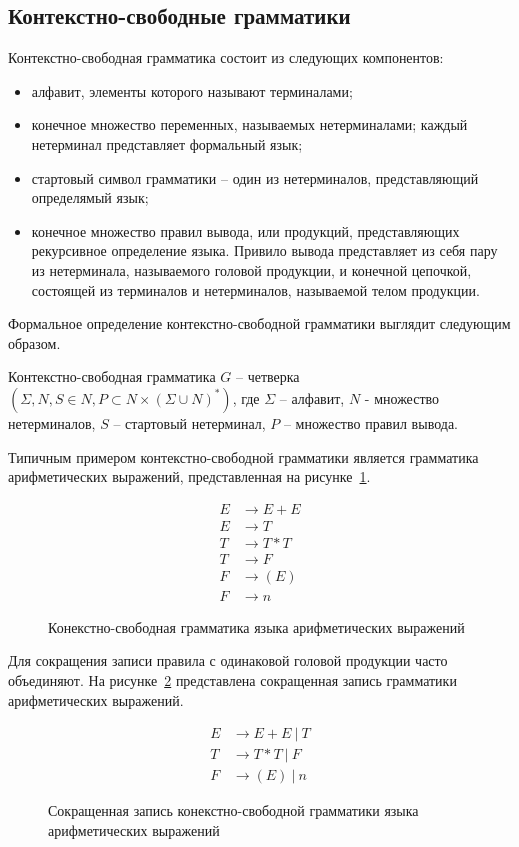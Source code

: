 \subsection{Контекстно-свободные грамматики}
Контекстно-свободная грамматика состоит из следующих компонентов:
\begin{itemize}
    \item алфавит, элементы которого называют терминалами;
    \item конечное множество переменных, называемых нетерминалами; каждый нетерминал представляет формальный язык;
    \item стартовый символ грамматики -- один из нетерминалов, представляющий определямый язык;
    \item конечное множество правил вывода, или продукций, представляющих рекурсивное определение языка.
    Привило вывода представляет из себя пару из нетерминала, называемого головой продукции, и конечной цепочкой,
    состоящей из терминалов и нетерминалов, называемой телом продукции.
\end{itemize}
Формальное определение контекстно-свободной грамматики выглядит следующим образом.
\begin{definition}
Контекстно-свободная грамматика $G$ -- четверка $(\Sigma, N, S \in N, P \subset N \times (\Sigma \cup N)^*)$,
где $\Sigma$ -- алфавит, $N$ - множество нетерминалов, $S$ -- стартовый нетерминал, $P$ -- множество правил вывода.
\end{definition}
Типичным примером контекстно-свободной грамматики является грамматика арифметических выражений, представленная на рисунке~\ref{cf-expr}.
\begin{figure}[htb]
    \begin{align*}
        E &\rightarrow E + E\\
        E &\rightarrow T\\
        T &\rightarrow T * T\\
        T &\rightarrow F\\
        F &\rightarrow (E)\\
        F &\rightarrow n
    \end{align*}
    \caption{Конекстно-свободная грамматика языка арифметических выражений}
    \label{cf-expr}
\end{figure}
Для сокращения записи правила с одинаковой головой продукции часто объединяют. На рисунке~\ref{cf-expr-small} представлена сокращенная запись грамматики арифметических выражений.
\begin{figure}[htb]
    \begin{align*}
        E &\rightarrow E + E\ |\ T\\
        T &\rightarrow T * T\ |\ F\\
        F &\rightarrow (E)\ |\ n
    \end{align*}
    \caption{Сокращенная запись конекстно-свободной грамматики языка арифметических выражений}
    \label{cf-expr-small}
\end{figure}
